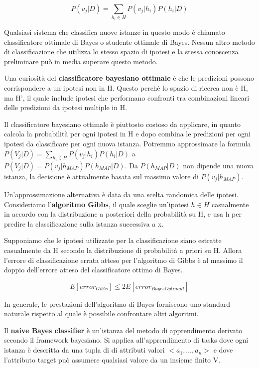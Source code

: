 \documentclass[a4paper]{extarticle}
\begin{document}
\begin{equation*}
P(v_j|D) = \sum\limits_{h_i \in H} P(v_j | h_i) P(h_i|D) 
\end{equation*}

Qualsiasi sistema che classifica nuove istanze in questo modo è chiamato classificatore ottimale di Bayes o studente ottimale di Bayes. Nessun altro metodo di classificazione che utilizza lo stesso spazio di ipotesi e la stessa conoscenza preliminare può in media superare questo metodo.

Una curiosità del \textbf{classificatore bayesiano ottimale} è che le predizioni possono corrispondere a un ipotesi non in H. Questo perchè lo spazio di ricerca non è H, ma H', il quale include ipotesi che performano confronti tra combinazioni lineari delle predizioni da ipotesi multiple in H.

Il classificatore bayesiano ottimale è piuttosto costoso da applicare, in quanto calcola la probabilità per ogni ipotesi in H e dopo combina le predizioni per ogni ipotesi da classificare per ogni nuova istanza. Potremmo approssimare la formula $P(V_j | D) = \sum\limits_{h_i \in H} P(v_j | h_i)P(h_i|D)$ a $P(V_j | D) = P(v_j | h_{MAP})P(h_{MAP}|D)$. Da $P(h_{MAP}|D)$ non dipende una nuova istanza, la decisione è attualmente basata sul massimo valore di $P(v_j|h_{MAP})$.

Un'approssimazione alternativa è data da una scelta randomica delle ipotesi. Consideriamo l'\textbf{algoritmo Gibbs}, il quale sceglie un'ipotesi $h\in H$ casualmente in accordo con la distribuzione a posteriori della probabilità su H, e usa h per predire la classificazione sulla istanza successiva a x.

Supponiamo che le ipotesi utilizzate per la classificazione siano estratte casualmente da H secondo la distribuzione di probabilità a priori su H. Allora l'errore di classificazione errata atteso per l'algoritmo di Gibbs è al massimo il doppio dell'errore atteso del classificatore ottimo di Bayes.

\begin{equation*}
E[error_{Gibbs}] \leq 2E[error_{BayesOptimall}]
\end{equation*}

In generale, le prestazioni dell'algoritmo di Bayes forniscono uno standard naturale rispetto al quale è possibile confrontare altri algoritmi.

Il \textbf{naive Bayes classifier} è un'istanza del metodo di apprendimento derivato secondo il  framework bayesiano. Si applica all'apprendimento di tasks dove ogni istanza è descritta da una tupla di di attributi valori $<a_1,\dots,a_n>$ e dove l'attributo target può assumere qualsiasi valore da un insieme finito V.
\end{document}
